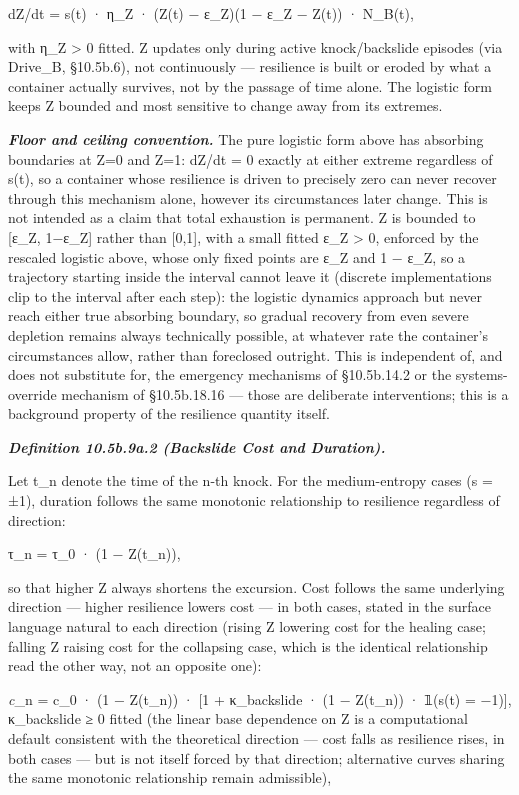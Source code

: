 \documentclass[
]{article}
\begin{document}
dZ/dt = s(t) · η\_Z · (Z(t) − ε\_Z)(1 − ε\_Z − Z(t)) · N\_B(t),

with η\_Z \textgreater{} 0 fitted. Z updates only during active
knock/backslide episodes (via Drive\_B, §10.5b.6), not continuously ---
resilience is built or eroded by what a container actually survives, not
by the passage of time alone. The logistic form keeps Z bounded and most
sensitive to change away from its extremes.

\emph{\textbf{Floor and ceiling convention.}} The pure logistic form
above has absorbing boundaries at Z=0 and Z=1: dZ/dt = 0 exactly at
either extreme regardless of s(t), so a container whose resilience is
driven to precisely zero can never recover through this mechanism alone,
however its circumstances later change. This is not intended as a claim
that total exhaustion is permanent. Z is bounded to {[}ε\_Z, 1−ε\_Z{]}
rather than {[}0,1{]}, with a small fitted ε\_Z \textgreater{} 0,
enforced by the rescaled logistic above, whose only fixed points are
ε\_Z and 1 − ε\_Z, so a trajectory starting inside the interval cannot
leave it (discrete implementations clip to the interval after each
step): the logistic dynamics approach but never reach either true
absorbing boundary, so gradual recovery from even severe depletion
remains always technically possible, at whatever rate the container's
circumstances allow, rather than foreclosed outright. This is
independent of, and does not substitute for, the emergency mechanisms of
§10.5b.14.2 or the systems-override mechanism of §10.5b.18.16 --- those
are deliberate interventions; this is a background property of the
resilience quantity itself.

\emph{\textbf{Definition 10.5b.9a.2 (Backslide Cost and Duration).}}

Let t\_n denote the time of the n-th knock. For the medium-entropy cases
(s = ±1), duration follows the same monotonic relationship to resilience
regardless of direction:

τ\_n = τ\_0 · (1 − Z(t\_n)),

so that higher Z always shortens the excursion. Cost follows the same
underlying direction --- higher resilience lowers cost --- in both
cases, stated in the surface language natural to each direction (rising
Z lowering cost for the healing case; falling Z raising cost for the
collapsing case, which is the identical relationship read the other way,
not an opposite one):

\emph{c}\_n = c\_0 · (1 − Z(t\_n)) · {[}1 + κ\_backslide · (1 − Z(t\_n))
· 𝟙(s(t) = −1){]}, κ\_backslide ≥ 0 fitted (the linear base dependence
on Z is a computational default consistent with the theoretical
direction --- cost falls as resilience rises, in both cases --- but is
not itself forced by that direction; alternative curves sharing the same
monotonic relationship remain admissible),
\end{document}
